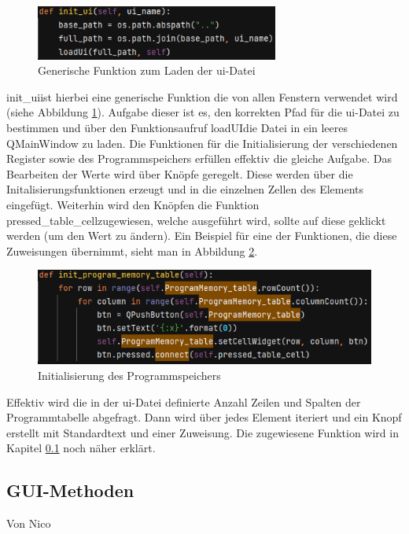 \documentclass[12pt]{article}
\newcommand{\imgSpaceBefore}{\vspace{10pt}}
\begin{document}
\vspace{15pt}

\begin{figure}[H]
\centering
\includegraphics[width=8cm]{bilder/initUI}
\caption{Generische Funktion zum Laden der \glqq ui\grqq-Datei}
\label{fig:InitUI}
\end{figure}


\noindent
\glqq init\_ui\grqq ist hierbei eine generische Funktion die von allen Fenstern verwendet wird (siehe Abbildung  \ref{fig:InitUI}).
Aufgabe dieser ist es, den korrekten Pfad für die \glqq ui\grqq-Datei zu bestimmen und über den Funktionsaufruf \glqq loadUI\grqq die Datei in ein leeres QMainWindow zu laden. Die Funktionen für die Initialisierung der verschiedenen Register sowie des Programmspeichers erfüllen effektiv die gleiche Aufgabe. Das Bearbeiten der Werte wird über Knöpfe geregelt. Diese werden über die Initalisierungsfunktionen erzeugt und in die einzelnen Zellen des Elements eingefügt. Weiterhin wird den Knöpfen die Funktion \glqq pressed\_table\_cell\grqq zugewiesen, welche ausgeführt wird, sollte auf diese geklickt werden (um den Wert zu ändern). Ein Beispiel für eine der Funktionen, die diese Zuweisungen übernimmt, sieht man in Abbildung \ref{fig:InitProgMem}.\imgSpaceBefore

\begin{figure}[H]
\centering
\includegraphics[width=12cm]{bilder/initProgMem}
\caption{Initialisierung des Programmspeichers}
\label{fig:InitProgMem}
\end{figure}

\noindent
Effektiv wird die in der \glqq ui\grqq-Datei definierte Anzahl Zeilen und Spalten der Programmtabelle abgefragt. Dann wird über jedes Element iteriert und ein Knopf erstellt mit Standardtext und einer Zuweisung. Die zugewiesene Funktion wird in Kapitel \ref{chapter:GUI-Methods} noch näher erklärt.


\subsection{GUI-Methoden}\label{chapter:GUI-Methods}
Von Nico\\
\end{document}
